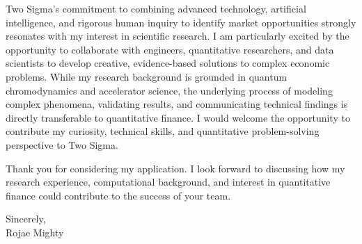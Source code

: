 \documentclass[10pt,letterpaper]{article}
\begin{document}
Two Sigma's commitment to combining advanced technology, artificial intelligence, and rigorous human inquiry to identify market opportunities strongly resonates with my interest in scientific research. I am particularly excited by the opportunity to collaborate with engineers, quantitative researchers, and data scientists to develop creative, evidence-based solutions to complex economic problems. While my research background is grounded in quantum chromodynamics and accelerator science, the underlying process of modeling complex phenomena, validating results, and communicating technical findings is directly transferable to quantitative finance. I would welcome the opportunity to contribute my curiosity, technical skills, and quantitative problem-solving perspective to Two Sigma.

Thank you for considering my application. I look forward to discussing how my research experience, computational background, and interest in quantitative finance could contribute to the success of your team.

\vspace{4pt}
Sincerely,\\[12pt]
Rojae Mighty
\end{document}
